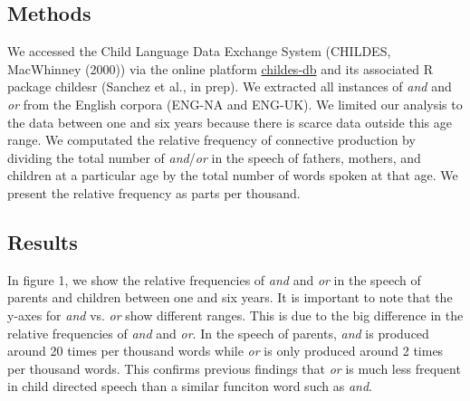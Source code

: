 \documentclass[10pt, letterpaper]{article}
\begin{document}
\subsection{Methods}\label{methods}

We accessed the Child Language Data Exchange System (CHILDES, MacWhinney
(2000)) via the online platform
\href{http://childes-db.stanford.edu/}{childes-db} and its associated R
package childesr (Sanchez et al., in prep). We extracted all instances
of \emph{and} and \emph{or} from the English corpora (ENG-NA and
ENG-UK). We limited our analysis to the data between one and six years
because there is scarce data outside this age range. We computated the
relative frequency of connective production by dividing the total number
of \emph{and}/\emph{or} in the speech of fathers, mothers, and children
at a particular age by the total number of words spoken at that age. We
present the relative frequency as parts per thousand.

\subsection{Results}\label{results}

In figure 1, we show the relative frequencies of \emph{and} and
\emph{or} in the speech of parents and children between one and six
years. It is important to note that the y-axes for \emph{and} vs.
\emph{or} show different ranges. This is due to the big difference in
the relative frequencies of \emph{and} and \emph{or}. In the speech of
parents, \emph{and} is produced around 20 times per thousand words while
\emph{or} is only produced around 2 times per thousand words. This
confirms previous findings that \emph{or} is much less frequent in child
directed speech than a similar funciton word such as \emph{and}.
\end{document}

